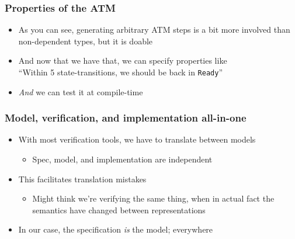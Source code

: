 \documentclass[compress,handout]{beamer}
\begin{document}
\begin{frame}
  \frametitle{Properties of the ATM}

  \begin{itemize}
    \item<1-> As you can see, generating arbitrary ATM steps is a bit more
              involved than non-dependent types, but it is doable
    \item<2-> And now that we have that, we can specify properties like\\
              ``Within 5 state-transitions, we should be back in
              {\textasciigrave\texttt{Ready}\textasciigrave}''
              \vspace*{-5mm}
              \vspace*{-2mm}
    \item<3-> \textit{And} we can test it at compile-time
              \vspace*{-5mm}
              \vspace*{-2mm}
  \end{itemize}

\end{frame}


\begin{frame}[fragile]
  \frametitle{Model, verification, and implementation all-in-one}

  \begin{itemize}
    \item<1-> With most verification tools, we have to translate between models
    \begin{itemize}
      \item<1-> Spec, model, and implementation are independent
    \end{itemize}
    \item<2-> This facilitates translation mistakes
    \begin{itemize}
      \item<2-> Might think we're verifying the same thing, when in actual fact
                the semantics have changed between representations
    \end{itemize}
    \item<3-> In our case, the specification \textit{is} the model; everywhere
  \end{itemize}

  \vspace*{-5mm}
  \vspace*{-5mm}

\end{frame}
\end{document}

